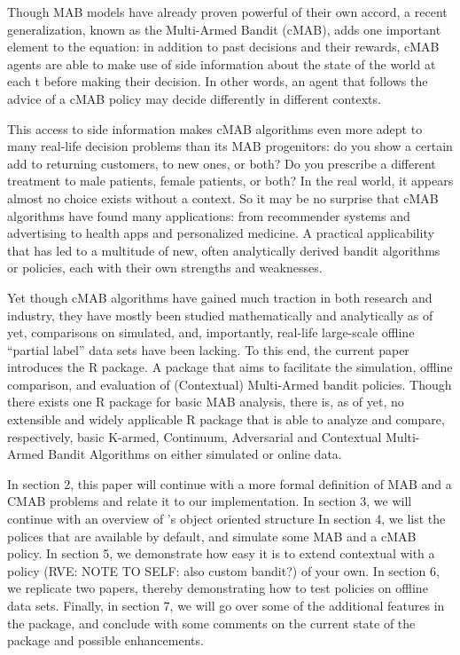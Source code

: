 \documentclass[nojss]{jss}\usepackage[]{graphicx}\usepackage[]{color}
\begin{document}
Though MAB models have already proven powerful of their own accord, a recent generalization, known as the  Multi-Armed Bandit (cMAB), adds one important element to the equation: in addition to past decisions and their rewards, cMAB agents are able to make use of side information about the state of the world at each t before making their decision. In other words, an agent that follows the advice of a cMAB policy may decide differently in different contexts.

This access to side information makes cMAB algorithms even more adept to many real-life decision problems than its MAB progenitors: do you show a certain add to returning customers, to new ones, or both? Do you prescribe a different treatment to male patients, female patients, or both? In the real world, it appears almost no choice exists without a context. So it may be no surprise that cMAB algorithms have found many applications: from recommender systems and advertising to health apps and personalized medicine. A practical applicability that has led to a multitude of new, often analytically derived bandit algorithms or policies, each with their own strengths and weaknesses.

Yet though cMAB algorithms have gained much traction in both research and industry, they have mostly been studied mathematically and analytically \textendash{} as of yet, comparisons on simulated, and, importantly, real-life large-scale offline \textquotedblleft{}partial label\textquotedblright{} data sets have been lacking. To this end, the current paper introduces the  R package. A package that aims to facilitate the simulation, offline comparison, and evaluation of (Contextual) Multi-Armed bandit policies. Though there exists one R package for basic MAB analysis, there is, as of yet, no extensible and widely applicable R package that is able to analyze and compare, respectively, basic K-armed, Continuum, Adversarial and Contextual Multi-Armed Bandit Algorithms on either simulated or online data.

In section 2, this paper will continue with a more formal definition of MAB and a CMAB problems and relate it to our implementation. In section 3, we will continue with an overview of ’s object oriented structure In section 4, we list the polices that are available by default, and simulate some MAB and a cMAB policy. In section 5, we demonstrate how easy it is to extend contextual with a policy (RVE: NOTE TO SELF: also custom  bandit?) of your own. In section 6, we replicate two papers, thereby demonstrating how to test policies on offline data sets. Finally, in section  7, we will go over some of the additional features in the package, and conclude with some comments on the current state of the package and possible enhancements.
\end{document}
